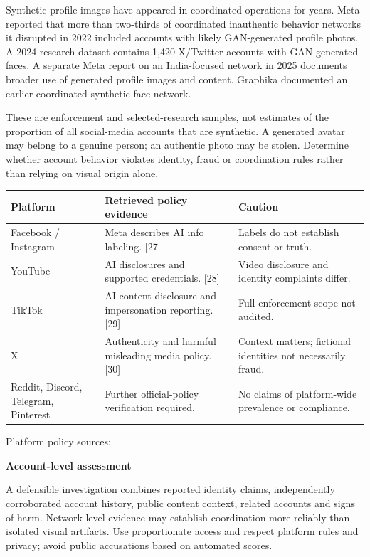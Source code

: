 \documentclass[11pt,a4paper]{article}
\newcommand{\sub}[1]{\vspace{1mm}\textbf{#1}\par}
\begin{document}
Synthetic profile images have appeared in coordinated operations for years. Meta reported that more than two-thirds of coordinated inauthentic behavior networks it disrupted in 2022 included accounts with likely GAN-generated profile photos. A 2024 research dataset contains 1,420 X/Twitter accounts with GAN-generated faces. A separate Meta report on an India-focused network in 2025 documents broader use of generated profile images and content. Graphika documented an earlier coordinated synthetic-face network. \cite{meta,fakefaces,metaindia,graphika}


These are enforcement and selected-research samples, not estimates of the proportion of all social-media accounts that are synthetic. A generated avatar may belong to a genuine person; an authentic photo may be stolen. Determine whether account behavior violates identity, fraud or coordination rules rather than relying on visual origin alone.


\begin{center}\small\begin{tabularx}{\linewidth}{@{}YYY@{}}\toprule
\textbf{Platform} & \textbf{Retrieved policy evidence} & \textbf{Caution}\\\midrule
Facebook / Instagram & Meta describes AI info labeling. [27] & Labels do not establish consent or truth.\\
YouTube & AI disclosures and supported credentials. [28] & Video disclosure and identity complaints differ.\\
TikTok & AI-content disclosure and impersonation reporting. [29] & Full enforcement scope not audited.\\
X & Authenticity and harmful misleading media policy. [30] & Context matters; fictional identities not necessarily fraud.\\
Reddit, Discord, Telegram, Pinterest & Further official-policy verification required. & No claims of platform-wide prevalence or compliance.\\\bottomrule\end{tabularx}\end{center}

Platform policy sources:  \cite{metalabel,youtube,tiktok,xpolicy}


\sub{Account-level assessment}

A defensible investigation combines reported identity claims, independently corroborated account history, public content context, related accounts and signs of harm. Network-level evidence may establish coordination more reliably than isolated visual artifacts. Use proportionate access and respect platform rules and privacy; avoid public accusations based on automated scores.
\end{document}
